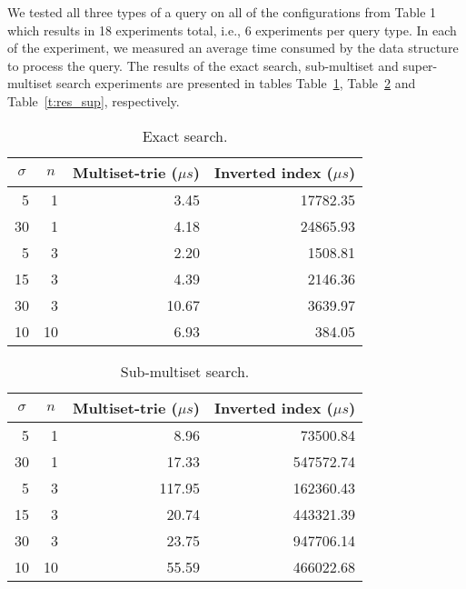 We tested all three types of a query on all of the configurations from Table 1 which results in 18 experiments total, i.e., 6 experiments per query type. In each of the experiment, we measured an average time consumed by the data structure to process the query. The results of the exact search, sub-multiset and super-multiset search experiments are presented in tables Table~\ref{t:res_ex}, Table~\ref{t:res_sub} and Table~\ref{t:res_sup}, respectively.

\begin{table}[h]
\center
\begin{tabular}{|r|r|r|r|}
\hline
\multicolumn{1}{|c|}{$\sigma$} & 
\multicolumn{1}{c|}{$n$} & 
\multicolumn{1}{c|}{Multiset-trie ($\mu s$)} & 
\multicolumn{1}{c|}{Inverted index ($\mu s$)} \\
\hline
5		& 1 & 3.45 & 17782.35\\
\hline
30	& 1 & 4.18 & 24865.93\\
\hline
5		& 3 & 2.20 & 1508.81\\
\hline
15	& 3 & 4.39 & 2146.36\\
\hline
30	& 3 & 10.67 & 3639.97\\
\hline
10	& 10 & 6.93 & 384.05\\
\hline
\end{tabular}
\caption{Exact search.}
\label{t:res_ex}
\end{table}

\begin{table}[h]
\center
\begin{tabular}{|r|r|r|r|}
\hline
\multicolumn{1}{|c|}{$\sigma$} & 
\multicolumn{1}{c|}{$n$} & 
\multicolumn{1}{c|}{Multiset-trie ($\mu s$)} & 
\multicolumn{1}{c|}{Inverted index ($\mu s$)} \\
\hline
5		& 1			& 8.96 & 73500.84\\
\hline
30	& 1			& 17.33 & 547572.74\\
\hline
5		& 3			& 117.95 & 162360.43\\
\hline
15	& 3			& 20.74 & 443321.39\\
\hline
30	& 3 		& 23.75 & 947706.14\\
\hline
10	& 10		& 55.59 & 466022.68\\
\hline
\end{tabular}
\caption{Sub-multiset search.}
\label{t:res_sub}
\end{table}

